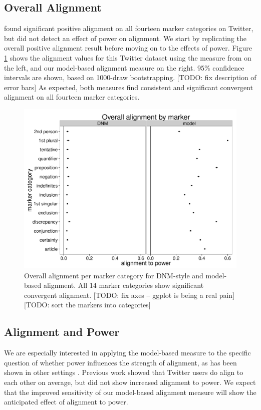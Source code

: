 \documentclass{acm_proc_article-sp}
\begin{document}
\subsection{Overall Alignment}
\cite{DNMGamonDumais2011} found significant positive alignment on all fourteen marker categories on Twitter, but did not detect an effect of power on alignment.  We start by replicating the overall positive alignment result before moving on to the effects of power.  Figure \ref{fig:overall-alignment} shows the alignment values for this Twitter dataset using the measure from \cite{DNMGamonDumais2011} on the left, and our model-based alignment measure on the right.  95\% confidence intervals are shown, based on 1000-draw bootstrapping. [TODO: fix description of error bars] As expected, both measures find consistent and significant convergent alignment on all fourteen marker categories.  

\begin{figure}
\centering
\includegraphics[width=.9\columnwidth]{graphics/www2016_alignmentdnmour_uniform.pdf}
\caption{Overall alignment per marker category for DNM-style and model-based alignment. All 14 marker categories show significant convergent alignment. [TODO: fix axes -- ggplot is being a real pain] [TODO: sort the markers into categories]}\label{fig:overall-alignment}
\end{figure}


\subsection{Alignment and Power}
We are especially interested in applying the model-based measure to the specific question of whether power influences the strength of alignment, as has been shown in other settings \cite{DNMEtAl2012,BayesianEchoChamber,?}. Previous work \cite{DNMGamonDumais2011} showed that Twitter users do align to each other on average, but did not show increased alignment to power.  We expect that the improved sensitivity of our model-based alignment measure will show the anticipated effect of alignment to power.
\end{document}
